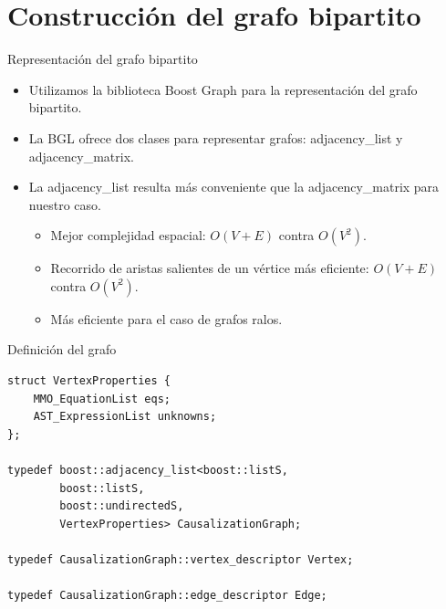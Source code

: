 \section{Construcción del grafo bipartito}

\begin{frame}{Representación del grafo bipartito}
    \begin{itemize}
        \item<1-> Utilizamos la biblioteca Boost Graph para la representación del grafo bipartito.
        \item<2-> La BGL ofrece dos clases para representar grafos: adjacency\_list y adjacency\_matrix.
        \item<3-> La adjacency\_list resulta más conveniente que la adjacency\_matrix para nuestro caso. 
        \begin{itemize}
            \item<4-> Mejor complejidad espacial: $O(V+E)$ contra $O(V^{2})$.
            \item<5-> Recorrido de aristas salientes de un vértice más eficiente: $O(V+E)$ contra $O(V^{2})$.
            \item<6-> Más eficiente para el caso de grafos ralos.
        \end{itemize}
    \end{itemize}
\end{frame}

\begin{frame}[fragile]{Definición del grafo}
   \fontsize{9pt}{7.2}\selectfont
    \begin{lstlisting}
struct VertexProperties {
    MMO_EquationList eqs;
    AST_ExpressionList unknowns;
};

typedef boost::adjacency_list<boost::listS,
        boost::listS,
        boost::undirectedS,
        VertexProperties> CausalizationGraph;

typedef CausalizationGraph::vertex_descriptor Vertex;

typedef CausalizationGraph::edge_descriptor Edge;
    \end{lstlisting}
\end{frame}

